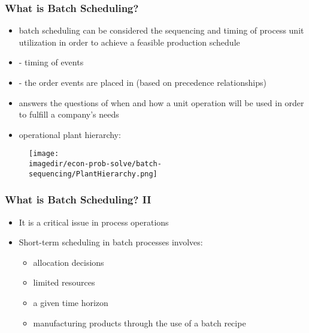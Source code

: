 \begin{frame}\frametitle{What is Batch Scheduling?}
	\begin{itemize}
		\item	batch scheduling can be considered the sequencing and timing of process unit utilization in order to achieve a feasible production schedule		
		\item	{} - timing of events 
		\item	{} - the order events are placed in (based on precedence relationships)		
		\item	answers the questions of when and how a unit operation will be used in order to fulfill a company's needs
		\item	operational plant hierarchy:
	\end{itemize}
	\begin{figure}
		[!htb] 
		\begin{center}
			\texttt{[image: \\imagedir/econ-prob-solve/batch-sequencing/PlantHierarchy.png]} \label{fig:PH} 
		\end{center}
	\end{figure}
\end{frame}

\begin{frame}\frametitle{What is Batch Scheduling? II}
	\begin{itemize}
		\item	It is a critical issue in process operations 
		\item	Short-term scheduling in batch processes involves:
		\begin{itemize}
			\item	allocation decisions 
			\item	limited resources 
			\item	a given time horizon 
			\item	manufacturing products through the use of a batch recipe \cite{MendyNco06} 
		\end{itemize}
	\end{itemize}
\end{frame}

